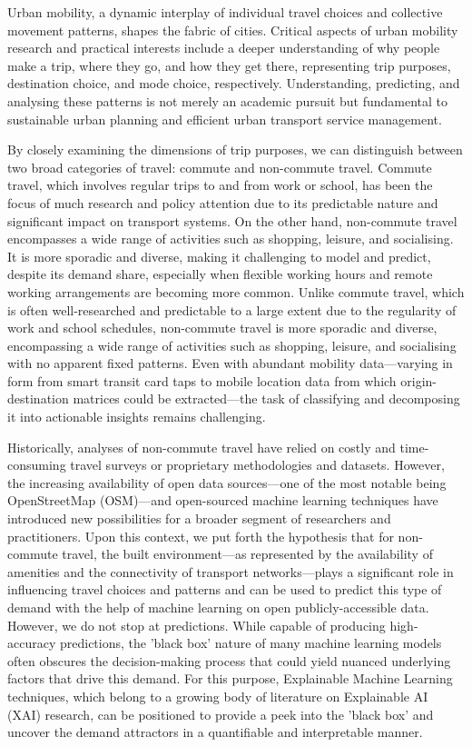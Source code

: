 Urban mobility, a dynamic interplay of individual travel choices and collective movement patterns, shapes the fabric of cities. Critical aspects of urban mobility research and practical interests include a deeper understanding of why people make a trip, where they go, and how they get there, representing trip purposes, destination choice, and mode choice, respectively. Understanding, predicting, and analysing these patterns is not merely an academic pursuit but fundamental to sustainable urban planning and efficient urban transport service management. 

By closely examining the dimensions of trip purposes, we can distinguish between two broad categories of travel: commute and non-commute travel. Commute travel, which involves regular trips to and from work or school, has been the focus of much research and policy attention due to its predictable nature and significant impact on transport systems. On the other hand, non-commute travel encompasses a wide range of activities such as shopping, leisure, and socialising. It is more sporadic and diverse, making it challenging to model and predict, despite its demand share, especially when flexible working hours and remote working arrangements are becoming more common. Unlike commute travel, which is often well-researched and predictable to a large extent due to the regularity of work and school schedules, non-commute travel is more sporadic and diverse, encompassing a wide range of activities such as shopping, leisure, and socialising with no apparent fixed patterns. Even with abundant mobility data---varying in form from smart transit card taps to mobile location data from which origin-destination matrices could be extracted---the task of classifying and decomposing it into actionable insights remains challenging. 

Historically, analyses of non-commute travel have relied on costly and time-consuming travel surveys or proprietary methodologies and datasets. However, the increasing availability of open data sources---one of the most notable being OpenStreetMap (OSM)---and open-sourced machine learning techniques have introduced new possibilities for a broader segment of researchers and practitioners. Upon this context, we put forth the hypothesis that for non-commute travel, the built environment---as represented by the availability of amenities and the connectivity of transport networks---plays a significant role in influencing travel choices and patterns and can be used to predict this type of demand with the help of machine learning on open publicly-accessible data. However, we do not stop at predictions. While capable of producing high-accuracy predictions, the 'black box' nature of many machine learning models often obscures the decision-making process that could yield nuanced underlying factors that drive this demand. For this purpose, Explainable Machine Learning techniques, which belong to a growing body of literature on Explainable AI (XAI) research, can be positioned to provide a peek into the 'black box' and uncover the demand attractors in a quantifiable and interpretable manner. 


